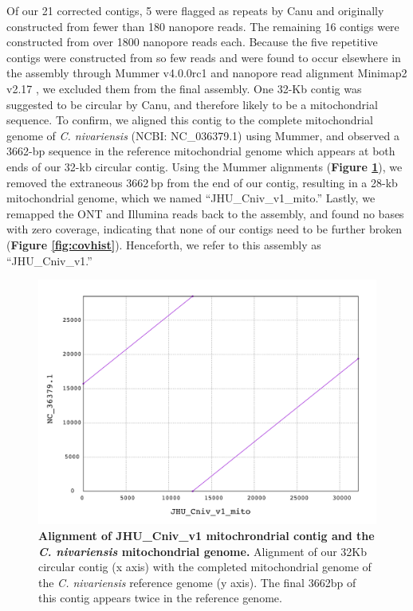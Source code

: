 Of our 21 corrected contigs, 5 were flagged as repeats by Canu and originally constructed from fewer than 180 nanopore reads. The remaining 16 contigs were constructed from over 1800 nanopore reads each. Because the five repetitive contigs were constructed from so few reads and were found to occur elsewhere in the assembly through Mummer v4.0.0rc1 \citep{Marcais2018-mm} and nanopore read alignment Minimap2 v2.17 \citep{Li2018-eq}, we excluded them from the final assembly. One 32-Kb contig was suggested to be circular by Canu, and therefore likely to be a mitochondrial sequence. To confirm, we aligned this contig to the complete mitochondrial genome of \textit{C. nivariensis} (NCBI: NC\_036379.1) using Mummer, and observed a 3662-bp sequence in the reference mitochondrial genome which appears at both ends of our 32-kb circular contig. Using the Mummer alignments ({\bf Figure \ref{fig:mito}}), we removed the extraneous 3662 bp from the end of our contig, resulting in a 28-kb mitochondrial genome, which we named “JHU\_Cniv\_v1\_mito.” Lastly, we remapped the ONT and Illumina reads back to the assembly, and found no bases with zero coverage, indicating that none of our contigs need to be further broken ({\bf Figure \ref{fig:covhist}}). Henceforth, we refer to this assembly as “JHU\_Cniv\_v1.”

\begin{figure}[!ht]
\centering
\includegraphics[width = 1\linewidth,keepaspectratio]{figure/mito.pdf}
\caption[Alignment of JHU\_Cniv\_v1 mitochrondrial contig and the \textit{C. nivariensis} mitochondrial genome]{{\bf Alignment of JHU\_Cniv\_v1 mitochrondrial contig and the \textit{C. nivariensis} mitochondrial genome.} Alignment of our 32Kb circular contig (x axis) with the completed mitochondrial genome of the \textit{C. nivariensis} reference genome (y axis). The final 3662bp of this contig appears twice in the reference genome. }
\label{fig:mito}
\end{figure}


